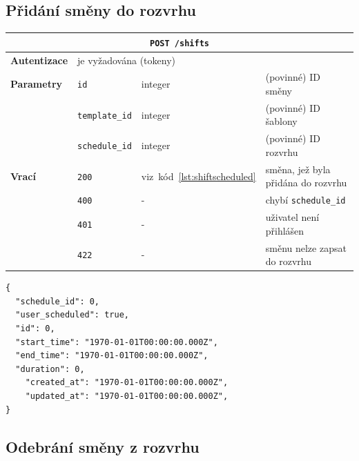 \documentclass[twoside]{ctuthesis}
\begin{document}
\subsection{Přidání směny do rozvrhu}

\begin{center}
	\begin{tabular}{p{.19\linewidth}p{.18\linewidth}p{.15\linewidth}p{.35\linewidth}}
		\hline
		\multicolumn{4}{c}{\texttt{POST /shifts}}\\
		\hline
		\textbf{Autentizace}  & 	\multicolumn{3}{l}{je vyžadována (tokeny)}\\
		\textbf{Parametry} 		& \texttt{id} & integer & (povinné) ID směny \\
												  & \texttt{template\_id} & integer & (povinné) ID šablony \\
												 	& \texttt{schedule\_id} & integer & (povinné) ID rozvrhu \\
		\textbf{Vrací} 				& \texttt{200} & viz~kód~\ref{lst:shiftscheduled} & směna, jež byla přidána do rozvrhu\\
													& \texttt{400} & - & chybí \texttt{schedule\_id}\\
													& \texttt{401} & - & uživatel není přihlášen\\
													& \texttt{422} & - & směnu nelze zapsat do rozvrhu\\
		\hline
	\end{tabular}
\end{center}

\begin{lstlisting}[caption={Odpověď po přidání směny do / odebrání směny z~rozvrhu}, label={lst:shiftscheduled}]
{
  "schedule_id": 0,
  "user_scheduled": true,
  "id": 0,
  "start_time": "1970-01-01T00:00:00.000Z",
  "end_time": "1970-01-01T00:00:00.000Z",
  "duration": 0,
	"created_at": "1970-01-01T00:00:00.000Z",
	"updated_at": "1970-01-01T00:00:00.000Z",
}
\end{lstlisting}

\subsection{Odebrání směny z rozvrhu}
\end{document}
